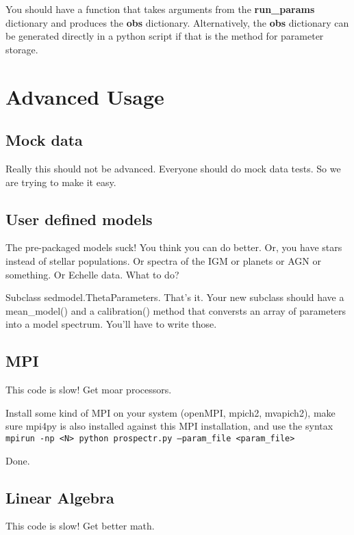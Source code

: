 
You should have a function that takes arguments from the {\bf
run_params} dictionary and produces the {\bf obs} dictionary.
Alternatively, the {\bf obs} dictionary can be generated directly in a
python script if that is the method for parameter storage.

\section{Advanced Usage}

\subsection{Mock data}
Really this should not be advanced.  Everyone should do mock data
tests.  So we are trying to make it easy.

\subsection{User defined models}
The pre-packaged models suck!  You think you can do better.  Or, you
have stars instead of stellar populations.  Or spectra of the IGM or
planets or AGN or something. Or Echelle data. What to do?

Subclass sedmodel.ThetaParameters.  That's it.  Your new subclass
should have a mean_model() and a calibration() method that conversts
an array of parameters into a model spectrum.  You'll have to write
those.

\subsection{MPI}
This code is slow!  Get moar processors.

Install some kind of MPI on your system (openMPI, mpich2, mvapich2), make sure mpi4py is also
installed against this MPI installation, and use the syntax
\texttt{mpirun -np <N> python prospectr.py --param_file <param_file>}

Done.

\subsection{Linear Algebra}
This code is slow!  Get better math.



